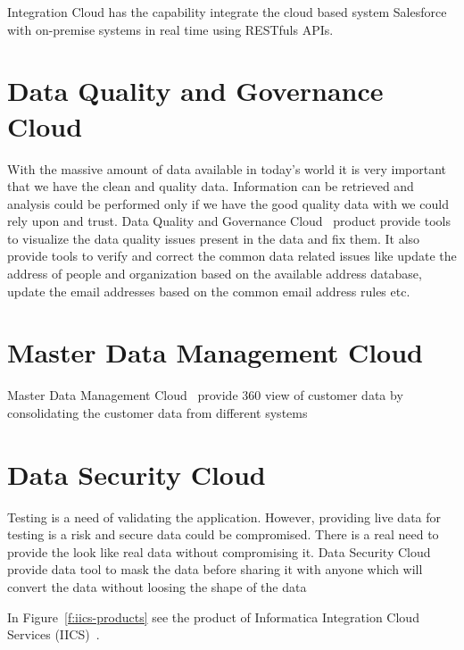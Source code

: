 Integration Cloud has the capability integrate the cloud based system
Salesforce~\cite{hid-sp18-511-salesforce} with on-premise systems in
real time using RESTfuls APIs.

\section{Data Quality and Governance Cloud}

With the massive amount of data available in today's world it is very
important that we have the clean and quality data. Information can be
retrieved and analysis could be performed only if we have the good
quality data with we could rely upon and trust. Data Quality and
Governance Cloud~\cite{hid-sp18-511-iics} product provide tools to
visualize the data quality issues present in the data and fix them. It
also provide tools to verify and correct the common data related
issues like update the address of people and organization based on the
available address database, update the email addresses based on the
common email address rules etc.

\section{Master Data Management Cloud}
Master Data Management Cloud~\cite{hid-sp18-511-iics} provide 360 view
of customer data by consolidating the customer data from different
systems

\section{Data Security Cloud}
Testing is a need of validating the application. However, providing
live data for testing is a risk and secure data could be
compromised. There is a real need to provide the look like real data
without compromising it. Data Security Cloud\cite{hid-sp18-511-iics}
provide data tool to mask the data before sharing it with anyone which
will convert the data without loosing the shape of the data

In Figure~\ref{f:iics-products}\cite{hid-sp18-511-iics} see the
product of Informatica Integration Cloud Services
(IICS)~\cite{hid-sp18-511-iics}.


